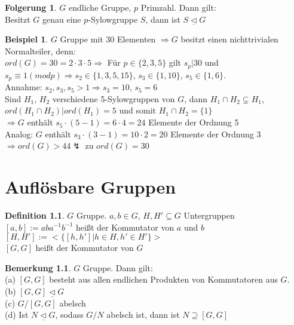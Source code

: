 \documentclass[10pt,a4paper,numbers=endperiod]{scrreprt}
\theoremstyle{definition}
\newtheorem{defi}[satz]{Definition}
\newtheorem{bem}[satz]{Bemerkung}
\newtheorem{bsp}[satz]{Beispiel}
\newtheorem{folg}[satz]{Folgerung}
\begin{document}
\begin{folg}
	$G$ endliche Gruppe, $p$ Primzahl. Dann gilt:\\
	Besitzt $G$ genau eine $p$-Sylowgruppe $S$, dann ist $S \underline{\vartriangleleft} G$
\end{folg}

\begin{bsp}
	$G$ Gruppe mit 30 Elementen $\Rightarrow G$ besitzt einen nichttrivialen Normalteiler, denn:\\
	$ord(G) = 30 = 2 \cdot 3 \cdot 5 \Rightarrow$ Für $p \in \{2,3,5\}$ gilt $s_p|30$ und $s_p \equiv 1 (mod p) \Rightarrow s_2 \in \{1,3,5,15\}$, $s_3 \in \{1,10\}$, $s_5 \in \{1,6\}$.\\
	Annahme: $s_2, s_3, s_5 > 1 \Rightarrow s_3 = 10$, $s_5 = 6$\\
	Sind $H_1$, $H_2$ verschiedene 5-Sylowgruppen von $G$, dann $H_1 \cap H_2 \subsetneq H_1$, $ord(H_1 \cap H_2) | ord(H_1) = 5$ und somit $H_1 \cap H_2 = \{1\}$\\
	$\Rightarrow G$ enthält $s_5 \cdot (5-1) = 6 \cdot 4 = 24$ Elemente der Ordnung 5\\
	Analog: $G$ enthält $s_3 \cdot (3-1) = 10 \cdot 2 = 20$ Elemente der Ordnung 3\\
	$\Rightarrow ord(G) > 44 \lightning$ zu $ord(G) = 30$
\end{bsp}

\chapter{Auflösbare Gruppen} 

\begin{defi}
	$G$ Gruppe. $a,b \in G$, $H, H' \subseteq G$ Untergruppen\\
	$[a,b] := aba^{-1}b^{-1}$ heißt der Kommutator von $a$ und $b$\\
	$[H, H'] := <\{[h,h']| h \in H, h' \in H'\}>$\\
	$[G, G]$ heißt der Kommutator von $G$\\
\end{defi}

\begin{bem}
	$G$ Gruppe. Dann gilt:\\
	(a) $[G,G]$ besteht aus allen endlichen Produkten von Kommutatoren aus $G$.\\
	(b) $[G, G] \underline{\vartriangleleft} G$\\
	(c) $G/[G, G]$ abelsch\\
	(d) Ist $N \underline{\vartriangleleft} G$, sodass $G/N$ abelsch ist, dann ist $N \supseteq [G, G]$
\end{bem}
\end{document}
